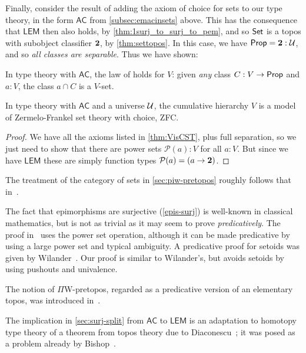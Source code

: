 Finally, consider the result of adding the axiom of choice for sets to our type theory, in the form  $\mathsf{AC}$ from \autoref{subsec:emacinsets} above.  This has the consequence that $\mathsf{LEM}$ then also holds, by \autoref{thm:1surj_to_surj_to_pem}, and so $\mathsf{Set}$ is a topos with subobject classifier $\mathbf{2}$, by \autoref{thm:settopos}.  In this case, we have $\mathsf{Prop} = \mathbf{2}:\mathcal{U}$, and so \emph{all classes are separable}.  Thus we have shown:

\begin{lem}\label{lem:fullsep}
In type theory with $\mathsf{AC}$, the law of  holds for $V$: given \emph{any} class $C : V \to \mathsf{Prop}$ and $a : V$, the class $a \cap C$ is a $V$-set.
\end{lem}

\begin{thm}\label{thm:zfc}
In type theory with $\mathsf{AC}$ and a universe $\mathcal{U}$, the cumulative hierarchy $V$ is a model of Zermelo-Frankel set theory with choice, ZFC.
\end{thm}

\begin{proof}
We have all the axioms listed in \autoref{thm:VisCST}, plus full separation, so we just need to show that there are power sets $\mathcal{P}(a):V$ for all $a:V$.  But since we have $\mathsf{LEM}$ these are simply function types $\mathcal{P}(a) = (a\to\mathbf{2})$.
\end{proof}

\sectionNotes

The treatment of the category of sets in \autoref{sec:piw-pretopos} roughly follows that in~\cite{RijkeSpitters}.

The fact that epimorphisms are surjective (\autoref{epis-surj}) is well-known in classical mathematics, but is not as trivial as it may seem to prove \emph{predicatively}.
The proof in~\cite{Mines/R/R:1988} uses the power set operation, although it can be made predicative by using a large power set and typical ambiguity.
A predicative proof for setoids was given by Wilander~\cite{Wilander2010}. 
Our proof is similar to Wilander's, but avoids setoids by using pushouts and univalence.

The notion of $\Pi$W-pretopos, regarded as a predicative version of an elementary topos, was introduced in~\cite{MoerdijkPalmgren}.

The implication in \autoref{sec:surj-split} from $\mathsf{AC}$ to $\mathsf{LEM}$ is an adaptation to homotopy type theory of a theorem from topos theory due to Diaconescu~\cite{Diaconescu}; it was posed as a problem already by Bishop~\cite[Problem 2,p58]{Bishop1967}.

